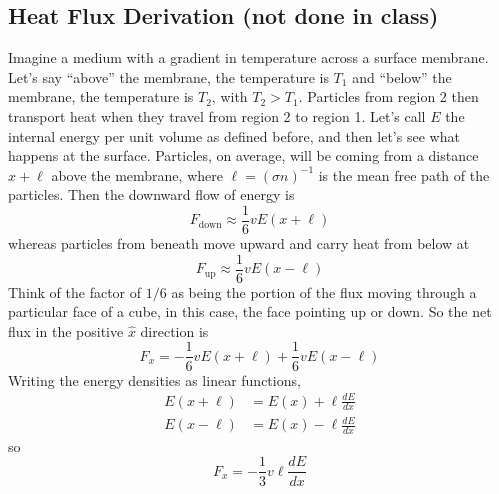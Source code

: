 \documentclass[10pt]{article}
\numberwithin{equation}{section}
\begin{document}
        \subsection{Heat Flux Derivation (not done in class)}
        Imagine a medium with a gradient in temperature across a surface
membrane. Let's say ``above'' the membrane, the temperature is $T_1$
and ``below'' the membrane, the temperature is $T_2$, with
$T_2>T_1$. Particles from region 2 then transport heat when they
travel from region 2 to region 1. Let's call $E$ the internal energy
per unit volume as defined before, and then let's see what happens at
the surface. Particles, on average, will be coming from a distance
$x+\ell$ above the membrane, where $\ell=(\sigma n)^{-1}$ is the mean
free path of the particles. Then the downward flow of energy is 
\begin{equation}
  \label{eq:3}
  F_{\mathrm{down}}\approx \frac{1}{6} vE(x+\ell)
\end{equation}
whereas particles from beneath move upward and carry heat from below
at
\begin{equation}
  \label{eq:1}
  F_{\mathrm{up}}\approx \frac{1}{6}vE(x-\ell)
\end{equation}
Think of the factor of $1/6$ as being the portion of the flux moving
through a particular face of a cube, in this case, the face pointing
up or down. So the net flux in the positive $\hat{x}$ direction is
\begin{equation}
  \label{eq:1a}
  F_x=-\frac{1}{6}vE(x+\ell)+\frac{1}{6}vE(x-\ell)
\end{equation}
Writing the energy densities as linear functions,
\begin{align}
  \label{eq:2}
  E(x+\ell) &= E(x)+\ell\frac{dE}{dx}\\
  \label{eq:2a}
  E(x-\ell) &= E(x)-\ell\frac{dE}{dx}
\end{align}
so
\begin{equation}
  \label{eq:4}
  F_x=-\frac{1}{3}v\ell\frac{dE}{dx}
\end{equation}
\end{document}
